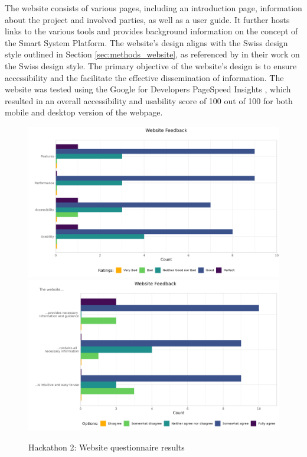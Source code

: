 The website consists of various pages, including an introduction page, information about the project and involved parties, as well as a user guide. It further hosts links to the various tools and provides background information on the concept of the Smart System Platform. The website's design aligns with the Swiss design style outlined in Section \ref{sec:methods_website}, as referenced by \citet{muller-brockmann_grid_2020, hollis_swiss_2006} in their work on the Swiss design style. The primary objective of the website's design is to ensure accessibility and the facilitate the effective dissemination of information. The website was tested using the Google for Developers PageSpeed Insights \citep{noauthor_pagespeed_nodate}, which resulted in an overall accessibility and usability score of 100 out of 100 for both mobile and desktop version of the webpage.

\begin{figure}[H]
    \centering
    \includegraphics[width=.75\linewidth]{rstudio/survey/plots/website.png}\\
    \includegraphics[width=.75\linewidth]{rstudio/survey/plots/website2.png}
    \vspace{\ftspace}
    \caption{Hackathon 2: Website questionnaire results}
    \vspace{\ftspace}
    \label{fig:website_questions}
\end{figure}

